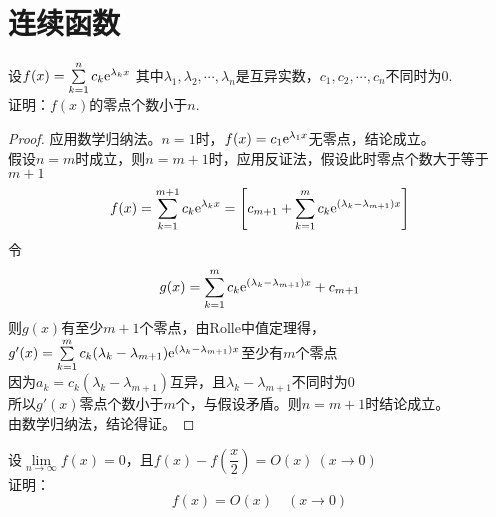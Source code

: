 \section{连续函数}

\begin{proposition}

    设$f(x) = \sum\limits_{k = 1}^{n}{c_k\mathrm{e}^{\lambda_k x}}$
    其中$\lambda_1, \lambda_2 ,\cdots, \lambda_n$是互异实数，$c_1, c_2, \cdots , c_n$不同时为$0$. \\
    证明：$f(x)$的零点个数小于$n$.

\end{proposition}

\begin{proof}

    应用数学归纳法。$n = 1$时，$f(x) = c_1 \mathrm{e}^{\lambda_1 x}$无零点，结论成立。\\
    假设$n = m$时成立，则$n = m + 1$时，应用反证法，假设此时零点个数大于等于$m + 1$
    $$f(x) = \sum\limits_{k  = 1}^{m + 1}{c_k\mathrm{e}^{\lambda_k x}} = \left[c_{m + 1} + \sum\limits_{k  = 1}^{m}{c_k\mathrm{e}^{(\lambda_k - \lambda_{m + 1}) x}}\right]$$
    令
    $$g(x) = \sum\limits_{k  = 1}^{m}{c_k\mathrm{e}^{(\lambda_k - \lambda_{m + 1}) x}} + c_{m + 1}$$
    则$g(x)$有至少$m + 1$个零点，由\textup{Rolle}中值定理得，$g'(x) = \sum\limits_{k  = 1}^{m}{c_k (\lambda_k - \lambda_{m + 1}) \mathrm{e}^{(\lambda_k - \lambda_{m + 1}) x}}$至少有$m$个零点\\
    因为$a_k = c_k(\lambda_k - \lambda_{m + 1})$互异，且$\lambda_k - \lambda_{m + 1}$不同时为$0$\\
    所以$g'(x)$零点个数小于$m$个，与假设矛盾。则$n = m + 1$时结论成立。\\
    由数学归纳法，结论得证。

\end{proof}

\begin{proposition}

    设$\lim\limits_{n \to \infty}{f(x)} = 0$，且$f(x) - f\left(\dfrac{x}{2}\right) = O(x) \ (x\to 0)$\\
    证明：
    $$f(x) = O(x) \quad (x \to 0)$$

\end{proposition}

